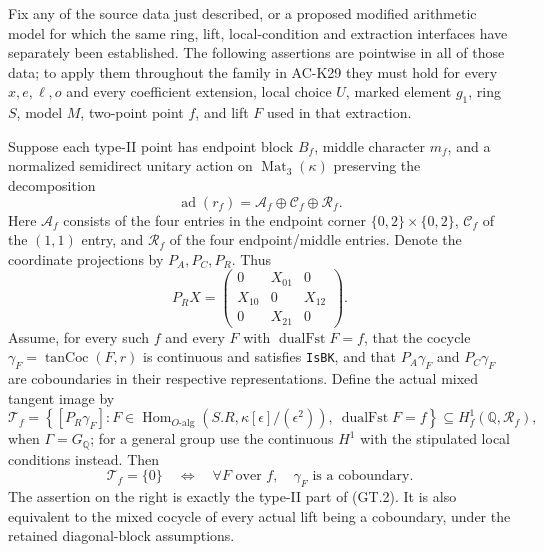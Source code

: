 \begin{proposition}
\label{AC-K29-tangent}
Fix any of the source data just described, or a proposed modified
arithmetic model for which the same ring, lift, local-condition and
extraction interfaces have separately been established.
The following assertions are pointwise in all of those data; to
apply them throughout the family in AC-K29 they must hold for every
$x,e,\ell,o$ and every coefficient extension, local choice $U$,
marked element $g_1$, ring $S$, model $M$, two-point point $f$, and
lift $F$ used in that extraction.

Suppose each type-II point has endpoint block $B_f$, middle
character $m_f$, and a normalized semidirect unitary action on
$\operatorname{Mat}_3(\kappa)$ preserving the decomposition
\[
 \operatorname{ad}(r_f)=\mathcal A_f\oplus\mathcal C_f
                                      \oplus\mathcal R_f.       \tag{GT.3}
\]
Here $\mathcal A_f$ consists of the four entries in the endpoint
corner $\{0,2\}\times\{0,2\}$, $\mathcal C_f$ of the $(1,1)$
entry, and $\mathcal R_f$ of the four endpoint/middle entries.
Denote the coordinate projections by $P_A,P_C,P_R$.  Thus
\[
 P_RX=\begin{pmatrix}
 0&X_{01}&0\\ X_{10}&0&X_{12}\\0&X_{21}&0
 \end{pmatrix}.                                               \tag{GT.4}
\]
Assume, for every such $f$ and every $F$ with
$\operatorname{dualFst}F=f$, that the cocycle
$\gamma_F=\operatorname{tanCoc}(F,r)$ is continuous and satisfies
\texttt{IsBK}, and that $P_A\gamma_F$ and $P_C\gamma_F$ are
coboundaries in their respective representations.
Define the actual mixed tangent image by
\[
 \mathcal T_f=
 \left\{[P_R\gamma_F]:
 F\in\operatorname{Hom}_{O\text{-alg}}
       (S.R,\kappa[\epsilon]/(\epsilon^2)),\
       \operatorname{dualFst}F=f\right\}
       \subseteq H^1_f(\mathbb Q,\mathcal R_f),                 \tag{GT.5}
\]
when $\Gamma=G_{\mathbb Q}$; for a general group use the
continuous $H^1$ with the stipulated local conditions instead.
Then
\[
 \mathcal T_f=\{0\}
 \quad\Longleftrightarrow\quad
 \forall F\text{ over }f,\quad
       \gamma_F\text{ is a coboundary}.                         \tag{GT.6}
\]
The assertion on the right is exactly the type-II part of (GT.2).
It is also equivalent to the mixed cocycle of every actual lift
being a coboundary, under the retained diagonal-block assumptions.


\end{proposition}
